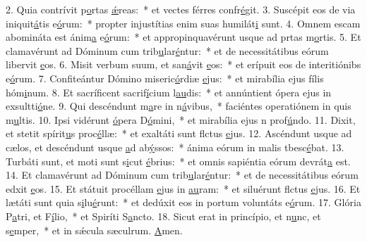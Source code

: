 2. Quia contrívit p\uline{o}rtas \uline{ǽ}reas:~* et vectes férres confr\uline{é}git.
3. Suscépit eos de via iniquit\uline{á}tis e\uline{ó}rum:~* propter injustítias enim suas humilát\uline{i} sunt.
4. Omnem escam abomináta est ánim\uline{a} e\uline{ó}rum:~* et appropinquavérunt usque ad prtas m\uline{o}rtis.
5. Et clamavérunt ad Dóminum cum trib\uline{u}lar\uline{é}ntur:~* et de necessitátibus eórum libervit \uline{e}os.
6. Misit verbum suum, et san\uline{á}vit \uline{e}os:~* et erípuit eos de interitiónibs e\uline{ó}rum.
7. Confiteántur Dómino miseric\uline{ó}rdiæ \uline{e}jus:~* et mirabília ejus fílis hóm\uline{i}num.
8. Et sacríficent sacrif\uline{í}cium l\uline{au}dis:~* et annúntient ópera ejus in exsultti\uline{ó}ne.
9. Qui descéndunt m\uline{a}re in n\uline{á}vibus,~* faciéntes operatiónem in quis m\uline{u}ltis.
10. Ipsi vidérunt \uline{ó}pera D\uline{ó}mini,~* et mirabília ejus n prof\uline{ú}ndo.
11. Dixit, et stetit spírit\uline{u}s proc\uline{é}llæ:~* et exaltáti sunt flctus \uline{e}jus.
12. Ascéndunt usque ad cælos, et descéndunt usque \uline{a}d ab\uline{ý}ssos:~* ánima eórum in malis tbesc\uline{é}bat.
13. Turbáti sunt, et moti sunt s\uline{i}cut \uline{é}brius:~* et omnis sapiéntia eórum devrát\uline{a} est.
14. Et clamavérunt ad Dóminum cum trib\uline{u}lar\uline{é}ntur:~* et de necessitátibus eórum edxit \uline{e}os.
15. Et státuit procéllam \uline{e}jus in \uline{au}ram:~* et siluérunt flctus \uline{e}jus.
16. Et lætáti sunt quia s\uline{i}lu\uline{é}runt:~* et dedúxit eos in portum voluntáts e\uline{ó}rum.
17. Glória P\uline{a}tri, et F\uline{í}lio,~* et Spiríti S\uline{a}ncto.
18. Sicut erat in princípio, et n\uline{u}nc, et s\uline{e}mper,~* et in sǽcula sæculrum. \uline{A}men.
